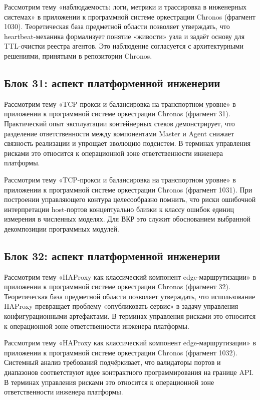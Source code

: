  Рассмотрим тему «наблюдаемость: логи, метрики и трассировка в инженерных системах» в приложении к программной системе оркестрации Chronos (фрагмент 1030). Теоретическая база предметной области позволяет утверждать, что heartbeat-механика формализует понятие «живости» узла и задаёт основу для TTL-очистки реестра агентов. Это наблюдение согласуется с архитектурными решениями, принятыми в репозитории Chronos.

\subsection{Блок 31: аспект платформенной инженерии}
 Рассмотрим тему «TCP-прокси и балансировка на транспортном уровне» в приложении к программной системе оркестрации Chronos (фрагмент 31). Практический опыт эксплуатации контейнерных стеков демонстрирует, что разделение ответственности между компонентами Master и Agent снижает связность реализации и упрощает эволюцию подсистем. В терминах управления рисками это относится к операционной зоне ответственности инженера платформы.

 Рассмотрим тему «TCP-прокси и балансировка на транспортном уровне» в приложении к программной системе оркестрации Chronos (фрагмент 1031). При построении управляющего контура целесообразно помнить, что риски ошибочной интерпретации host-портов концептуально близки к классу ошибок единиц измерения в численных моделях. Для ВКР это служит обоснованием выбранной декомпозиции программных модулей.

\subsection{Блок 32: аспект платформенной инженерии}
 Рассмотрим тему «HAProxy как классический компонент edge-маршрутизации» в приложении к программной системе оркестрации Chronos (фрагмент 32). Теоретическая база предметной области позволяет утверждать, что использование HAProxy превращает проблему «опубликовать сервис» в задачу управления конфигурационными артефактами. В терминах управления рисками это относится к операционной зоне ответственности инженера платформы.

 Рассмотрим тему «HAProxy как классический компонент edge-маршрутизации» в приложении к программной системе оркестрации Chronos (фрагмент 1032). Системный анализ требований подчёркивает, что валидаторы портов и диапазонов соответствуют идее контрактного программирования на границе API. В терминах управления рисками это относится к операционной зоне ответственности инженера платформы.

